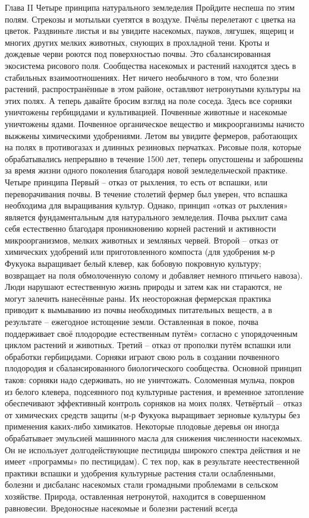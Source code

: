 \documentclass[a4paper]{book}
\begin{document}
Глава II Четыре принципа натурального земледелия
Пройдите неспеша по этим полям. Стрекозы и мотыльки суетятся в воздухе. Пчёлы
перелетают с цветка на цветок. Раздвиньте листья и вы увидите насекомых, пауков, лягушек,
ящериц и многих других мелких животных, снующих в прохладной тени. Кроты и дождевые
черви роются под поверхностью почвы.
Это сбалансированная экосистема рисового поля. Сообщества насекомых и растений
находятся здесь в стабильных взаимоотношениях. Нет ничего необычного в том, что болезни
растений, распространённые в этом районе, оставляют нетронутыми культуры на этих
полях.
А теперь давайте бросим взгляд на поле соседа. Здесь все сорняки уничтожены
гербицидами и культивацией. Почвенные животные и насекомые уничтожены ядами.
Почвенное органическое вещество и микроорганизмы начисто выжжены химическими
удобрениями. Летом вы увидите фермеров, работающих на полях в противогазах и длинных
резиновых перчатках. Рисовые поля, которые обрабатывались непрерывно в течение 1500 лет,
теперь опустошены и заброшены за время жизни одного поколения благодаря новой
земледельческой практике.
Четыре принципа
Первый – отказ от рыхления, то есть от вспашки, или переворачивания почвы. В течение
столетий фермер был уверен, что вспашка необходима для выращивания культур. Однако,
принцип «отказ от рыхления» является фундаментальным для натурального земледелия.
Почва рыхлит сама себя естественно благодаря проникновению корней растений и
активности микроорганизмов, мелких животных и земляных червей.
Второй – отказ от химических удобрений или приготовленного компоста (для удобрения
м-р Фукуока выращивает белый клевер, как бобовую покровную культуру; возвращает на
поля обмолоченную солому и добавляет немного птичьего навоза). Люди нарушают
естественную жизнь природы и затем как ни стараются, не могут залечить нанесённые раны.
Их неосторожная фермерская практика приводит к вымыванию из почвы необходимых
питательных веществ, а в результате – ежегодное истощение земли. Оставленная в покое,
почва поддерживает своё плодородие естественным путём» согласно с упорядоченным
циклом растений и животных.
Третий – отказ от прополки путём вспашки или обработки гербицидами. Сорняки
играют свою роль в создании почвенного плодородия и сбалансированного биологического
сообщества. Основной принцип таков: сорняки надо сдерживать, но не уничтожать.
Соломенная мульча, покров из белого клевера, подсеянного под культурные растения, и
временное затопление обеспечивают эффективный контроль сорняков на моих полях.
Четвёртый – отказ от химических средств защиты (м-р Фукуока выращивает зерновые
культуры без применения каких-либо химикатов. Некоторые плодовые деревья он иногда
обрабатывает эмульсией машинного масла для снижения численности насекомых. Он не
использует долгодействующие пестициды широкого спектра действия и не имеет
«программы» по пестицидам). С тех пор, как в результате неестественной практики вспашки
и удобрения культурные растения стали ослабленными, болезни и дисбаланс насекомых
стали громадными проблемами в сельском хозяйстве. Природа, оставленная нетронутой,
находится в совершенном равновесии. Вредоносные насекомые и болезни растений всегда
\end{document}
